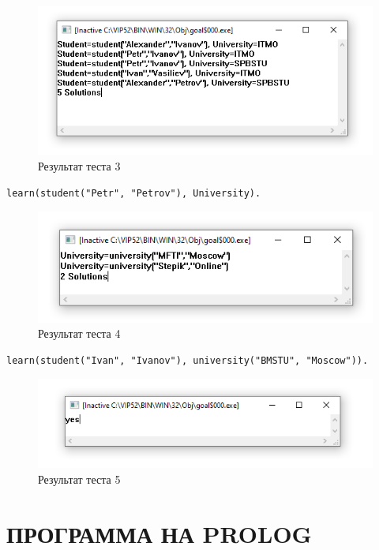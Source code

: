 \begin{figure}[H]
    \centering
    \includegraphics{img/SP.png}
    \caption{Результат теста 3}
\end{figure}

\begin{lstlisting}[caption=Тест 4]
learn(student("Petr", "Petrov"), University).
\end{lstlisting}

\begin{figure}[H]
    \centering
    \includegraphics{img/Petr.png}
    \caption{Результат теста 4}
\end{figure}

\begin{lstlisting}[caption=Тест 5]
learn(student("Ivan", "Ivanov"), university("BMSTU", "Moscow")).
\end{lstlisting}

\begin{figure}[H]
    \centering
    \includegraphics{img/Ivan.png}
    \caption{Результат теста 5}
\end{figure}

\section{ПРОГРАММА НА PROLOG}

